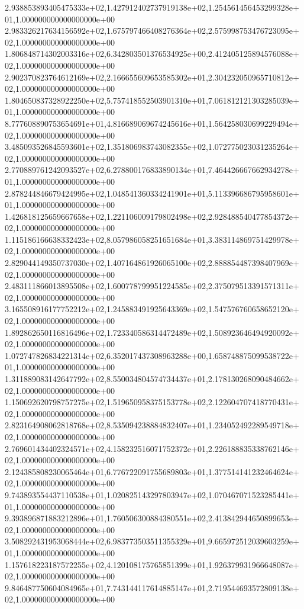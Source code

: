 2.938853893405475333e+02,1.427912402737919138e+02,1.254561456453299328e+01,1.000000000000000000e+00
2.983326217634156592e+02,1.675797466408276364e+02,2.575998753476723095e+02,1.000000000000000000e+00
1.806848714302003316e+02,6.342803501376534925e+00,2.412405125894576088e+02,1.000000000000000000e+00
2.902370823764612169e+02,2.166655609653585302e+01,2.304232050965710812e+02,1.000000000000000000e+00
1.804650837328922250e+02,5.757418552503901310e+01,7.061812121303285039e+01,1.000000000000000000e+00
8.777608890753654691e+01,4.816689069674245616e+01,1.564258030699229494e+02,1.000000000000000000e+00
3.485093526845593601e+02,1.351806983743082355e+02,1.072775023031235264e+02,1.000000000000000000e+00
2.770889761242093527e+02,6.278800176833890134e+01,7.464426667662934278e+01,1.000000000000000000e+00
2.878244846679424995e+02,1.048541360334241901e+01,5.113396686795958601e+01,1.000000000000000000e+00
1.426818125659667658e+02,1.221106009179802498e+02,2.928488540477854372e+02,1.000000000000000000e+00
1.115186166638332423e+02,8.057986058251651684e+01,3.383114869751429978e+02,1.000000000000000000e+00
2.829044149350737030e+02,1.407164861926065100e+02,2.888854487398407969e+02,1.000000000000000000e+00
2.483111866013895508e+02,1.600778799951224585e+02,2.375079513391571311e+02,1.000000000000000000e+00
3.165508916177752212e+02,1.245883491925643369e+02,1.547576760658652120e+02,1.000000000000000000e+00
1.892862650116816496e+02,1.723340586314472489e+02,1.508923646494920092e+02,1.000000000000000000e+00
1.072747826834221314e+02,6.352017437308963288e+00,1.658748875099538722e+01,1.000000000000000000e+00
1.311889083142647792e+02,8.550034804574734437e+01,2.178130268090484662e+02,1.000000000000000000e+00
1.150692620798757275e+02,1.519650958375153778e+02,2.122604707418770431e+02,1.000000000000000000e+00
2.823164908062818768e+02,8.535094238884832407e+01,1.234052492289549718e+02,1.000000000000000000e+00
2.769601434402324571e+02,4.158232516071752372e+01,2.226188835338762146e+02,1.000000000000000000e+00
2.124385808230065464e+01,6.776722091755689803e+01,1.377514141232464624e+02,1.000000000000000000e+00
9.743893554437110538e+01,1.020825143297803947e+02,1.070467071523285441e+01,1.000000000000000000e+00
9.393896871883212896e+01,1.760506300884380551e+02,2.413842944650899653e+02,1.000000000000000000e+00
3.508292431953068444e+02,6.983773503511355329e+01,9.665972512039603259e+01,1.000000000000000000e+00
1.157618223187572255e+02,4.120108175765851399e+01,1.926379931966648087e+02,1.000000000000000000e+00
9.846487750604084965e+01,7.743144117614885147e+01,2.719544693572809138e+02,1.000000000000000000e+00
